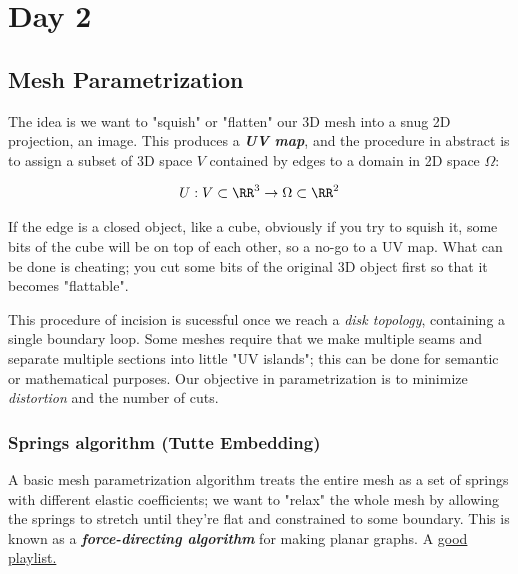 \chapter{Day 2}

\section{Mesh Parametrization}

\begin{definition}[UV Maps]

The idea is we want to "squish" or "flatten" our 3D mesh into a snug
2D projection, an image. This produces a \emph{\textbf{UV map}}, and
the procedure in abstract is to assign a subset of 3D space 
$V$ contained by edges to a domain in 2D space $\Omega$:

\begin{align*}
    U: V\subset \RR^3 \rightarrow \Omega \subset \RR^2
\end{align*}
    
\end{definition}

If the edge is a closed object, like a cube, obviously if you try to squish
it, some bits of the cube will be on top of each other, so a no-go to
a UV map. What can be done is cheating; you cut some bits of the original
3D object first so that it becomes "flattable".

\spa

This procedure of incision is sucessful once we reach a
\emph{disk topology}, containing a single boundary loop. Some meshes
require that we make multiple seams and separate multiple sections into
little "UV islands"; this can be done for semantic or mathematical
purposes. Our objective in parametrization is to minimize
\emph{distortion} and the number of cuts.

\subsection{Springs algorithm (Tutte Embedding)}

A basic mesh parametrization algorithm treats the entire mesh as a
set of springs with different elastic coefficients; we want to
"relax" the whole mesh by allowing the springs to stretch until they're
flat and constrained to some boundary. This is known as a
\emph{\textbf{force-directing algorithm}} for making planar graphs.
A \href{https://www.youtube.com/watch?v=WWm-g2nLHds&list=PLubYOWSl9mIvtnRjCCHP3wqNETTHYjQex}{good playlist.}

